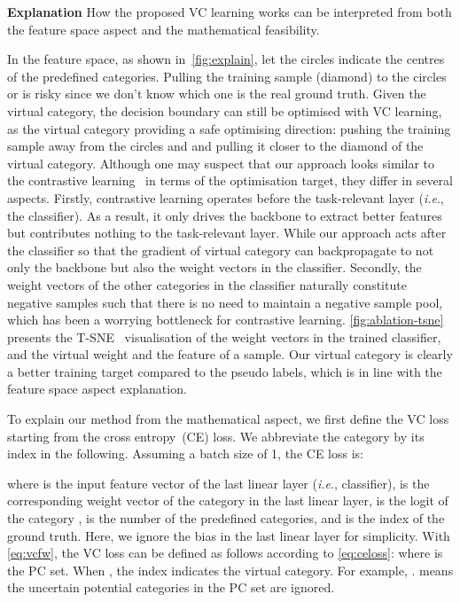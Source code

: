 \documentclass[runningheads]{llncs}
\def\ie{\emph{i.e}., } \def\Ie{\emph{I.e}., }
\begin{document}
\vspace{0.5em}\noindent\textbf{Explanation} How the proposed VC learning works can be interpreted from both the feature space aspect and the mathematical feasibility.

In the feature space, as shown in~\cref{fig:explain}, let the circles indicate the centres of the predefined categories. Pulling the training sample (diamond) to the circles  or  is risky since we don't know which one is the real ground truth. Given the virtual category, the decision boundary can still be optimised with VC learning, as the virtual category providing a safe optimising direction: pushing the training sample away from the circles  and  and pulling it closer to the diamond of the virtual category. Although one may suspect that our approach looks similar to the contrastive learning~\cite{Kaiming_2020_Mom,Ting_2020_A_S} in terms of the optimisation target, they differ in several aspects. Firstly, contrastive learning operates before the task-relevant layer (\ie the classifier). As a result, it only drives the backbone to extract better features but contributes nothing to the task-relevant layer. While our approach acts after the classifier so that the gradient of virtual category can backpropagate to not only the backbone but also the weight vectors in the classifier. Secondly, the weight vectors of the other categories in the classifier naturally constitute negative samples such that there is no need to maintain a negative sample pool, which has been a worrying bottleneck for contrastive learning. \cref{fig:ablation-tsne} presents the T-SNE~\cite{Van_2008_Vis} visualisation of the weight vectors  in the trained classifier, and the virtual weight  and the feature  of a sample. Our virtual category is clearly a better training target compared to the pseudo labels, which is in line with the feature space aspect explanation.

To explain our method from the mathematical aspect, we first define the VC loss starting from the cross entropy~(CE) loss. We abbreviate the category  by its index  in the following. Assuming a batch size of 1, the CE loss is:

\noindent where  is the input feature vector of the last linear layer (\ie classifier),  is the corresponding weight vector of the category  in the last linear layer,  is the logit of the category ,  is the number of the predefined categories, and  is the index of the ground truth. Here, we ignore the bias in the last linear layer for simplicity. With \cref{eq:vcfw}, the VC loss can be defined as follows according to \cref{eq:celoss}:
 where  is the PC set. When , the index indicates the virtual category. For example, .  means the uncertain potential categories in the PC set are ignored. 
\end{document}
